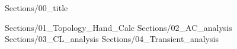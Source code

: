 \documentclass{article}
\begin{document}
{Sections/00_title}

{Sections/01_Topology_Hand_Calc}
\newpage
{Sections/02_AC_analysis}
\newpage
{Sections/03_CL_analysis}
\newpage
{Sections/04_Transient_analysis}

\end{document}
